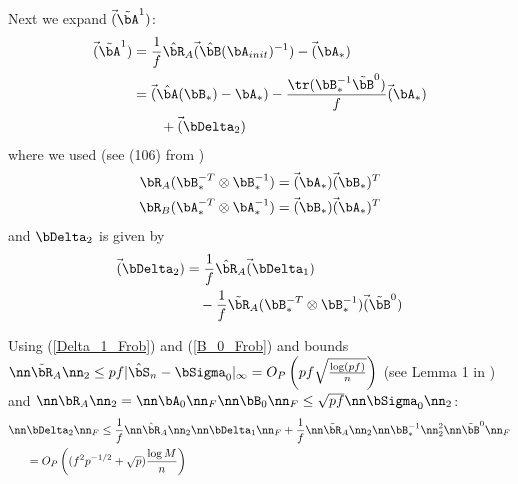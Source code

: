 \begin{IEEEproof}
Next we expand $\vec(\tilde{\bA}^1)$:
\begin{align}
	\vec(\tilde{\bA}^1) &= \frac{1}{f} \hat{\bR}_A \vec( \hat{\bB}(\bA_{init})^{-1}) - \vec(\bA_*) \nonumber \\
		&= \vec(\hat{\bA}(\bB_*)-\bA_*) - \frac{\tr(\bB_*^{-1} \tilde{\bB}^0)}{f} \vec(\bA_*) \nonumber \\
		&\qquad + \vec(\bDelta_2) \label{A_1_error}
\end{align}
where we used (see (106) from \cite{EstCovMatKron})
\begin{align}
	\bR_A(\bB_*^{-T}\otimes \bB_*^{-1}) &= \vec(\bA_*)\vec(\bB_*)^T \nonumber \\
	\bR_B(\bA_*^{-T}\otimes \bA_*^{-1}) &= \vec(\bB_*)\vec(\bA_*)^T \label{identities}
\end{align}
and $\bDelta_2$ is given by
\begin{align}
	\vec(\bDelta_2) &= \frac{1}{f} \hat{\bR}_A \vec(\bDelta_1) \nonumber \\
		&\quad - \frac{1}{f} \tilde{\bR}_A (\bB_*^{-T}\otimes \bB_*^{-1}) \vec(\tilde{\bB}^0)  \label{vec_Delta_2}
\end{align}

Using (\ref{Delta_1_Frob}) and (\ref{B_0_Frob}) and bounds $\nn \tilde{\bR}_A \nn_2 \leq pf |\hat{\bS}_n-\bSigma_0|_\infty=O_P\left( pf \sqrt{\frac{\log(pf)}{n}} \right)$ (see Lemma 1 in \cite{Rothman}) and $\nn \bR_A\nn_2 = \nn \bA_0 \nn_F \nn \bB_0 \nn_F \leq \sqrt{pf} \nn \bSigma_0 \nn_2$:
\begin{align}
	\nn & \bDelta_2 \nn_F \leq \frac{1}{f} \nn \hat{\bR}_A \nn_2 \nn \bDelta_1 \nn_F + \frac{1}{f} \nn \tilde{\bR}_A \nn_2 \nn \bB_*^{-1} \nn_2^2 \nn \tilde{\bB}^0\nn_F \nonumber \\
		&= O_P\left( (f^2p^{-1/2} + \sqrt{p}) \frac{\log M }{n} \right) \label{Delta_2_Frob}
\end{align}



\end{IEEEproof}
